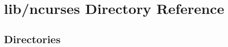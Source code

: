 \section{lib/ncurses Directory Reference}
\label{dir_4dd87a98ceaffbcb3b5750cfb64c851b}
\subsection*{Directories}
\begin{DoxyCompactItemize}
\end{DoxyCompactItemize}
